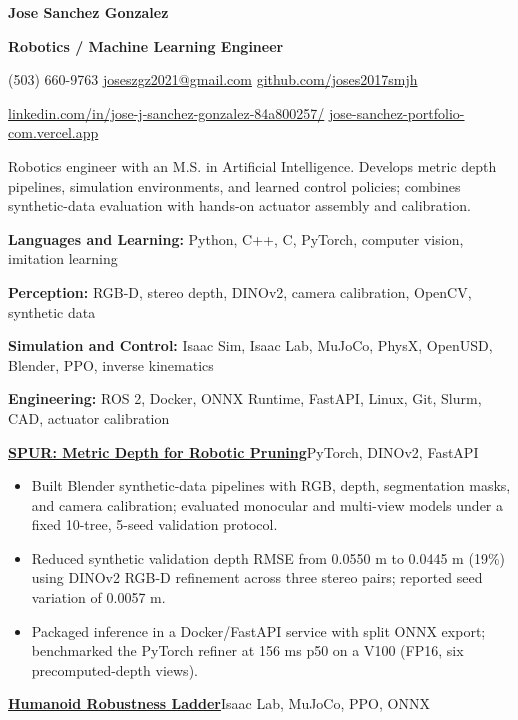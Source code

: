 \documentclass[letterpaper,10pt]{article}
\newcommand{\resumeSection}[1]{\par\vspace{7pt}{\large\bfseries #1}\par\vspace{3pt}}
\newcommand{\project}[3]{\par\vspace{3pt}\textbf{\href{#2}{#1}}\enspace\textbar\enspace #3\par}
\newcommand{\resumeItem}[1]{\item #1}
\begin{document}
{\fontsize{22}{25}\selectfont\bfseries Jose Sanchez Gonzalez}\par
\vspace{2pt}
\textbf{Robotics / Machine Learning Engineer}\par
\vspace{3pt}
{\fontsize{9}{10.5}\selectfont
(503) 660-9763\enspace\textbar\enspace
\href{mailto:joseszgz2021@gmail.com}{joseszgz2021@gmail.com}\enspace\textbar\enspace
\href{https://github.com/joses2017smjh}{github.com/joses2017smjh}\par
\href{https://linkedin.com/in/jose-j-sanchez-gonzalez-84a800257/}{linkedin.com/in/jose-j-sanchez-gonzalez-84a800257/}\enspace\textbar\enspace
\href{https://jose-sanchez-portfolio-com.vercel.app/}{jose-sanchez-portfolio-com.vercel.app}\par}
\resumeSection{Summary}
Robotics engineer with an M.S. in Artificial Intelligence. Develops metric depth pipelines, simulation environments, and learned control policies; combines synthetic-data evaluation with hands-on actuator assembly and calibration.
\resumeSection{Technical Skills}
\textbf{Languages and Learning:} Python, C++, C, PyTorch, computer vision, imitation learning\par
\textbf{Perception:} RGB-D, stereo depth, DINOv2, camera calibration, OpenCV, synthetic data\par
\textbf{Simulation and Control:} Isaac Sim, Isaac Lab, MuJoCo, PhysX, OpenUSD, Blender, PPO, inverse kinematics\par
\textbf{Engineering:} ROS 2, Docker, ONNX Runtime, FastAPI, Linux, Git, Slurm, CAD, actuator calibration\par
\resumeSection{Projects}
\project{SPUR: Metric Depth for Robotic Pruning}{https://github.com/joses2017smjh/spur-depth-service}{PyTorch, DINOv2, FastAPI}
\begin{itemize}
\resumeItem{Built Blender synthetic-data pipelines with RGB, depth, segmentation masks, and camera calibration; evaluated monocular and multi-view models under a fixed 10-tree, 5-seed validation protocol.}
\resumeItem{Reduced synthetic validation depth RMSE from 0.0550 m to 0.0445 m (19\%) using DINOv2 RGB-D refinement across three stereo pairs; reported seed variation of 0.0057 m.}
\resumeItem{Packaged inference in a Docker/FastAPI service with split ONNX export; benchmarked the PyTorch refiner at 156 ms p50 on a V100 (FP16, six precomputed-depth views).}
\end{itemize}
\project{Humanoid Robustness Ladder}{https://github.com/joses2017smjh/bhl-robustness-ladder}{Isaac Lab, MuJoCo, PPO, ONNX}
\end{document}
